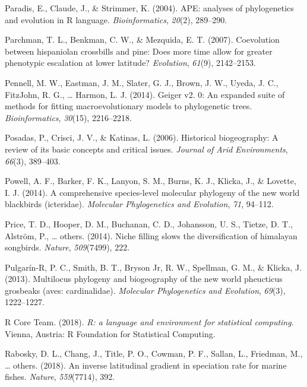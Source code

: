 \documentclass[
  man]{apa6}
\newlength{\cslhangindent}
\newlength{\cslentryspacingunit} %
\newenvironment{CSLReferences}[2] %
 {%
  \setlength{\parindent}{0pt}
  \ifodd #1
  \let\oldpar\par
  \def\par{\hangindent=\cslhangindent\oldpar}
  \fi
  \setlength{\parskip}{#2\cslentryspacingunit}
 }%
 {}
\begin{document}
\begin{CSLReferences}{1}{0}
\leavevmode{}%
Paradis, E., Claude, J., \& Strimmer, K. (2004). {APE: analyses of phylogenetics and evolution in R language}. \emph{Bioinformatics}, \emph{20}(2), 289--290.

\leavevmode{}%
Parchman, T. L., Benkman, C. W., \& Mezquida, E. T. (2007). Coevolution between hispaniolan crossbills and pine: Does more time allow for greater phenotypic escalation at lower latitude? \emph{Evolution}, \emph{61}(9), 2142--2153.

\leavevmode{}%
Pennell, M. W., Eastman, J. M., Slater, G. J., Brown, J. W., Uyeda, J. C., FitzJohn, R. G., \ldots{} Harmon, L. J. (2014). Geiger v2. 0: An expanded suite of methods for fitting macroevolutionary models to phylogenetic trees. \emph{Bioinformatics}, \emph{30}(15), 2216--2218.

\leavevmode{}%
Posadas, P., Crisci, J. V., \& Katinas, L. (2006). Historical biogeography: A review of its basic concepts and critical issues. \emph{{Journal of Arid Environments}}, \emph{66}(3), 389--403.

\leavevmode{}%
Powell, A. F., Barker, F. K., Lanyon, S. M., Burns, K. J., Klicka, J., \& Lovette, I. J. (2014). A comprehensive species-level molecular phylogeny of the new world blackbirds (icteridae). \emph{Molecular Phylogenetics and Evolution}, \emph{71}, 94--112.

\leavevmode{}%
Price, T. D., Hooper, D. M., Buchanan, C. D., Johansson, U. S., Tietze, D. T., Alström, P., \ldots{} others. (2014). Niche filling slows the diversification of himalayan songbirds. \emph{Nature}, \emph{509}(7499), 222.

\leavevmode{}%
Pulgarín-R, P. C., Smith, B. T., Bryson Jr, R. W., Spellman, G. M., \& Klicka, J. (2013). Multilocus phylogeny and biogeography of the new world pheucticus grosbeaks (aves: cardinalidae). \emph{Molecular Phylogenetics and Evolution}, \emph{69}(3), 1222--1227.

\leavevmode{}%
R Core Team. (2018). \emph{{R: a language and environment for statistical computing}}. Vienna, Austria: R Foundation for Statistical Computing.

\leavevmode{}%
Rabosky, D. L., Chang, J., Title, P. O., Cowman, P. F., Sallan, L., Friedman, M., \ldots{} others. (2018). An inverse latitudinal gradient in speciation rate for marine fishes. \emph{Nature}, \emph{559}(7714), 392.


\end{CSLReferences}
\end{document}
